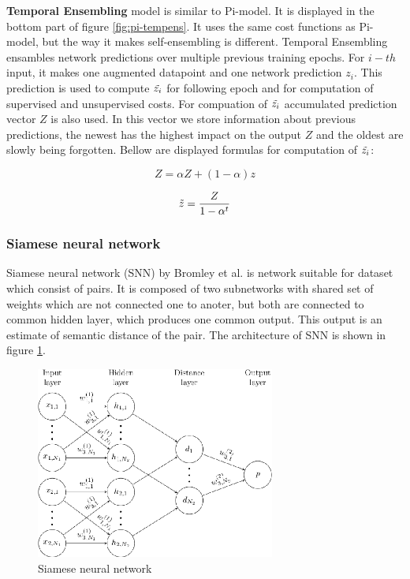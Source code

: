 \textbf{Temporal Ensembling} model is similar to Pi-model. It is displayed in the bottom part of figure \ref{fig:pi-tempens}. It uses the same cost functions as Pi-model, but the way it makes self-ensembling is different. Temporal Ensembling ensambles network predictions over multiple previous training epochs. For $i-th$ input, it makes one augmented datapoint and one network prediction $z_i$. This prediction is used to compute $\Tilde{z_i}$ for following epoch and for computation of supervised and unsupervised costs. 
For compuation of $\Tilde{z_i}$ accumulated prediction vector $Z$ is also used. In this vector we store information about previous predictions, the newest has the highest impact on the output $Z$ and the oldest are slowly being forgotten. Bellow are displayed formulas for computation of $\Tilde{z_i}$:

\begin{equation}
    Z = \alpha Z + (1 - \alpha) z
\end{equation}

\begin{equation}
        \Tilde{z} = \frac{Z}{1 - \alpha^t}
\end{equation}

\newpage
\subsubsection{Siamese neural network}
Siamese neural network (SNN) by Bromley et al. \cite{bromley1993} is network suitable for dataset which consist of pairs. It is composed of two subnetworks with shared set of weights which are not connected one to anoter, but both are connected to common hidden layer, which produces one common output. This output is an estimate of semantic distance of the pair. The architecture of SNN is shown in figure \ref{fig:siamese}.


\begin{figure}[h!]
    \centering
    \includegraphics[width=0.7\textwidth]{figs/siamese.png}
    \caption{Siamese neural network \cite{Koch2015SiameseNN}}
    \label{fig:siamese}
\end{figure}


